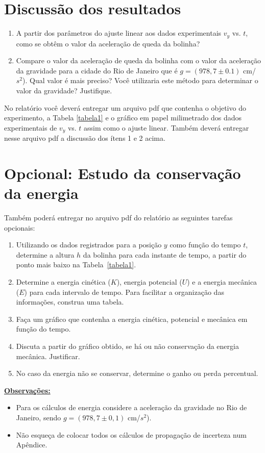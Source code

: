 \clearpage

\section{Discussão dos resultados}

\begin{enumerate}
\item A partir dos parâmetros do ajuste linear aos dados experimentais $v_y$ vs. $t$, 
como se obtêm o valor da aceleração de queda da bolinha?
\item 
Compare o valor da aceleração de queda da bolinha com o valor da aceleração da gravidade 
para a cidade do Rio de Janeiro que é $g=(978,7\pm 0.1)$ cm/$s^2$). 
Qual valor é mais preciso? Você utilizaria este método para determinar o valor da gravidade? Justifique.
\end{enumerate}
\par 
No relatório você deverá entregar um arquivo pdf que
contenha o objetivo do experimento, a Tabela \ref{tabela1} e o gráfico em papel milimetrado dos dados experimentais de $v_y$ vs. $t$ assim como o ajuste linear. Também deverá entregar nesse arquivo pdf  a discussão dos ítens 1 e 2 acima. 

\section{Opcional: Estudo da conservação da energia}
\indent

Também poderá entregar no arquivo pdf do relatório as seguintes tarefas opcionais:

\begin{enumerate}
\item Utilizando os dados registrados para a posição $y$ como função do tempo $t$, determine a altura $h$ da bolinha para cada instante de tempo, a partir do ponto mais baixo na Tabela~\ref{tabela1}.
\item Determine a energia cinética ($K$), energia potencial ($U$) e a energia mecânica ($E$) para cada intervalo de tempo. Para facilitar a organização das informações, construa uma tabela.
\item Faça um gráfico que contenha a energia cinética, potencial e mecânica em função do tempo.
\item Discuta a partir do gráfico obtido, se há ou não conservação da energia mecânica. Justificar.
\item No caso da energia não se conservar, determine o ganho ou perda percentual.
\end{enumerate}
\underline{\bf Observações:}
\\
\begin{itemize}
\item Para os cálculos de energia considere a aceleração da gravidade no Rio de Janeiro, 
sendo $g=(978,7\pm 0,1)$ cm/$s^2$).
\item Não esqueça de colocar todos os cálculos de propagação de incerteza num Apêndice.
\end{itemize}


